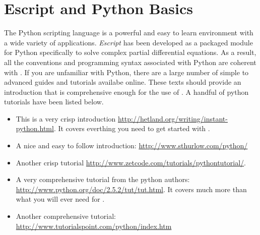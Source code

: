 
%
%
%

\section{Escript and Python Basics} \label{sec:escpybas}

The Python scripting language is a powerful and easy to learn environment with a wide variety of applications. \textit{Escript} has been developed as a packaged module for Python specifically to solve complex partial differential equations. As a result, all the conventions and programming syntax associated with Python are coherent with \ESCRIPT. If you are unfamiliar with Python, there are a large number of simple to advanced guides and tutorials availabe online. These texts should provide an introduction that is comprehensive enough for the use of \ESCRIPT. A handful of python tutorials have been listed below.
\begin{itemize}
\item This is a very crisp introduction \url{http://hetland.org/writing/instant-python.html}. It covers everthing you need to get started with \ESCRIPT.
\item A nice and easy to follow introduction: \url{http://www.sthurlow.com/python/}
\item Another crisp tutorial \url{http://www.zetcode.com/tutorials/pythontutorial/}. 
 \item A very comprehensive tutorial from the python authors: \url{http://www.python.org/doc/2.5.2/tut/tut.html}. It covers much more than what you will ever need for \ESCRIPT.
\item Another comprehensive tutorial: \url{http://www.tutorialspoint.com/python/index.htm}
\end{itemize} 

